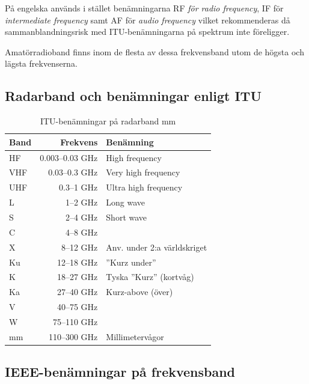 På engelska används i stället be\-nämn\-ing\-ar\-na RF {\it för radio
  frequency}, IF för {\it intermediate frequency} samt AF för {\it audio
  frequency} vilket rekommenderas då sammanblandningsrisk med
ITU-be\-nämn\-ing\-ar\-na på spektrum inte föreligger.

Amatörradioband finns inom de flesta av dessa frekvensband utom de högsta och
lägsta frekvenserna.

\subsection{Radarband och benämningar enligt ITU}

\begin{table}[H]
\centering

\begin{tabular}{lrl}
	\textbf{Band} & \textbf{Frekvens} & \textbf{Benämning}          \\ \hline
	HF            &   0.003--0.03 GHz & High frequency              \\
	VHF           &     0.03--0.3 GHz & Very high frequency          \\
	UHF           &        0.3--1 GHz & Ultra high frequency        \\
	L             &          1--2 GHz & Long wave                   \\
	S             &          2--4 GHz & Short wave                  \\
	C             &          4--8 GHz &  \\
	X             &         8--12 GHz & Anv. under 2:a världskriget \\
	Ku            &        12--18 GHz & ''Kurz under''              \\
	K             &        18--27 GHz & Tyska ''Kurz'' (kortvåg)    \\
	Ka            &        27--40 GHz & Kurz-above (över)           \\
	V             &        40--75 GHz &  \\
	W             &       75--110 GHz &  \\
	mm            &      110--300 GHz & Millimetervågor
\end{tabular}
\caption{ITU-benämningar på radarband mm}
\end{table}

\subsection{IEEE-benämningar på frekvensband}
\label{sec:IEEE-benamningar}


